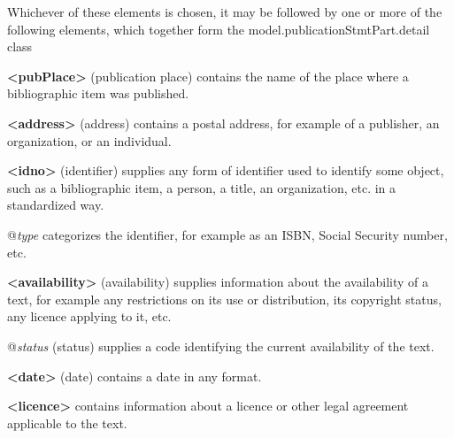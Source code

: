 Whichever of these elements is chosen, it may be followed by one or more of the following elements, which together form the \textsf{model.publicationStmtPart.detail} class 
\begin{sansreflist}
  
\item [\textbf{<pubPlace>}] (publication place) contains the name of the place where a bibliographic item was published.
\item [\textbf{<address>}] (address) contains a postal address, for example of a publisher, an organization, or an individual.
\item [\textbf{<idno>}] (identifier) supplies any form of identifier used to identify some object, such as a bibliographic item, a person, a title, an organization, etc. in a standardized way.\hfil\\[-10pt]\begin{sansreflist}
    \item[@{\itshape type}]
  categorizes the identifier, for example as an ISBN, Social Security number, etc.
\end{sansreflist}  
\item [\textbf{<availability>}] (availability) supplies information about the availability of a text, for example any restrictions on its use or distribution, its copyright status, any licence applying to it, etc.\hfil\\[-10pt]\begin{sansreflist}
    \item[@{\itshape status}]
  (status) supplies a code identifying the current availability of the text.
\end{sansreflist}  
\item [\textbf{<date>}] (date) contains a date in any format.
\item [\textbf{<licence>}] contains information about a licence or other legal agreement applicable to the text.
\end{sansreflist}
\par
